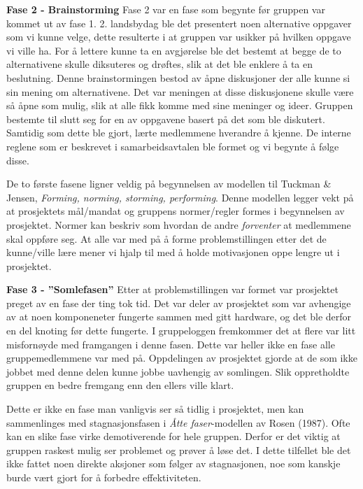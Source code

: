 

\noindent \textbf{\Large Fase 2 - Brainstorming}
Fase 2 var en fase som begynte før gruppen var kommet ut av fase 1. 
2. landsbydag ble det presentert noen alternative oppgaver som vi kunne velge, dette resulterte i at gruppen var usikker på hvilken oppgave vi ville ha. 
For å lettere kunne ta en avgjørelse ble det bestemt at begge de to alternativene skulle diksuteres og drøftes, slik at det ble enklere å ta en beslutning. 
Denne brainstormingen bestod av åpne diskusjoner der alle kunne si sin mening om alternativene. 
Det var meningen at disse diskusjonene skulle være så åpne som mulig, slik at alle fikk komme med sine meninger og ideer. 
Gruppen bestemte til slutt seg for en av oppgavene basert på det som ble diskutert. 
Samtidig som dette ble gjort, lærte medlemmene hverandre å kjenne. 
De interne reglene som er beskrevet i samarbeidsavtalen ble formet og vi begynte å følge disse. 

De to første fasene ligner veldig på begynnelsen av modellen til Tuckman \& Jensen, \textit{Forming, norming, storming, performing}. 
Denne modellen legger vekt på at prosjektets mål/mandat og gruppens normer/regler formes i begynnelsen av prosjektet. 
Normer kan beskriv som hvordan de andre \textit{forventer} at medlemmene skal oppføre seg\citep{schwarz}. 
At alle var med på å forme problemstillingen etter det de kunne/ville lære mener vi hjalp til med å holde motivasjonen oppe lengre ut i prosjektet. 
\vspace{\secspace}

\noindent \textbf{\Large Fase 3 - ''Somlefasen''}
Etter at problemstillingen var formet var prosjektet preget av en fase der ting tok tid. 
Det var deler av prosjektet som var avhengige av at noen komponeneter fungerte sammen med gitt hardware, og det ble derfor en del knoting før dette fungerte.  
I gruppeloggen fremkommer det at flere var litt misfornøyde med framgangen i denne fasen. 
Dette var heller ikke en fase alle gruppemedlemmene var med på. 
Oppdelingen av prosjektet gjorde at de som ikke jobbet med denne delen kunne jobbe uavhengig av somlingen. 
Slik oppretholdte gruppen en bedre fremgang enn den ellers ville klart. 

Dette er ikke en fase man vanligvis ser så tidlig i prosjektet, men kan sammenlinges med stagnasjonsfasen i \textit{Åtte faser}-modellen av Rosen (1987).
Ofte kan en slike fase virke demotiverende for hele gruppen. 
Derfor er det viktig at gruppen raskest mulig ser problemet og prøver å løse det. 
I dette tilfellet ble det ikke fattet noen direkte aksjoner som følger av stagnasjonen, noe som kanskje burde vært gjort for å forbedre effektiviteten. 
\vspace{\secspace}

